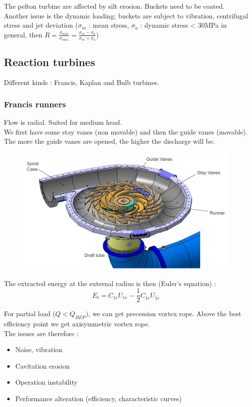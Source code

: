 \documentclass[../main.tex]{subfiles}
\begin{document}
The pelton turbine are affected by silt erosion. Buckets need to be coated. Another issue is the dynamic loading; buckets are subject to vibration, centrifugal stress and jet deviation ($\sigma_m$ : mean stress, $\sigma_a$ : dynamic stress < 30MPa in general, then $R = \frac{\sigma_{min}}{\sigma_{max}} = \frac{\sigma_m - \sigma_a}{\sigma_m + \sigma_a}$)\\

\subsection{Reaction turbines}
Different kinds : Francis, Kaplan and Bulb turbines.\\

\subsubsection{Francis runners}
Flow is radial. Suited for medium head. \\
We first have some stay vanes (non movable) and then the guide vanes (movable). The more the guide vanes are opened, the higher the discharge will be.

\begin{figure}[hbt!]
    \centering
    \includegraphics[width=0.6\linewidth]{IMAGES/Hydraulic/Screenshot from 2024-10-16 14-26-05.png}
\end{figure}

The extracted energy at the external radius is then (Euler's equation) : \begin{equation}
    E_t = C_{1e} U_{1e} - \frac{1}{2}C_{\overline{1e}} U_{\overline{1e}}
\end{equation}

For partial load ($Q<Q_{BEP})$, we can get precession vortex rope. Above the best efficiency point we get axisymmetric vortex rope. \\
The issues are therefore : \begin{itemize}
    \item Noise, vibration
    \item Cavitation erosion
    \item Operation instability
    \item Performance alteration (efficiency, characteristic curves)
\end{itemize}
\end{document}
